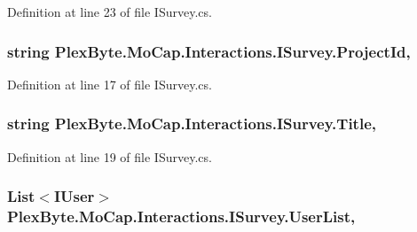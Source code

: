 Definition at line 23 of file I\+Survey.\+cs.

\subsubsection[{\texorpdfstring{Project\+Id}{ProjectId}}]{\setlength{\rightskip}{0pt plus 5cm}string Plex\+Byte.\+Mo\+Cap.\+Interactions.\+I\+Survey.\+Project\+Id\hspace{0.3cm}{\ttfamily [get]}, {\ttfamily [set]}}\hypertarget{interface_plex_byte_1_1_mo_cap_1_1_interactions_1_1_i_survey_a883f1354055ab9ee92c915b0c80e4f09}{}\label{interface_plex_byte_1_1_mo_cap_1_1_interactions_1_1_i_survey_a883f1354055ab9ee92c915b0c80e4f09}


Definition at line 17 of file I\+Survey.\+cs.

\subsubsection[{\texorpdfstring{Title}{Title}}]{\setlength{\rightskip}{0pt plus 5cm}string Plex\+Byte.\+Mo\+Cap.\+Interactions.\+I\+Survey.\+Title\hspace{0.3cm}{\ttfamily [get]}, {\ttfamily [set]}}\hypertarget{interface_plex_byte_1_1_mo_cap_1_1_interactions_1_1_i_survey_ae7b5e153360d5d3ecba8c2d7a6f12bf4}{}\label{interface_plex_byte_1_1_mo_cap_1_1_interactions_1_1_i_survey_ae7b5e153360d5d3ecba8c2d7a6f12bf4}


Definition at line 19 of file I\+Survey.\+cs.

\subsubsection[{\texorpdfstring{User\+List}{UserList}}]{\setlength{\rightskip}{0pt plus 5cm}List$<$I\+User$>$ Plex\+Byte.\+Mo\+Cap.\+Interactions.\+I\+Survey.\+User\+List\hspace{0.3cm}{\ttfamily [get]}, {\ttfamily [set]}}\hypertarget{interface_plex_byte_1_1_mo_cap_1_1_interactions_1_1_i_survey_a6b54305054f73c4a53a1293316a690fe}{}\label{interface_plex_byte_1_1_mo_cap_1_1_interactions_1_1_i_survey_a6b54305054f73c4a53a1293316a690fe}


